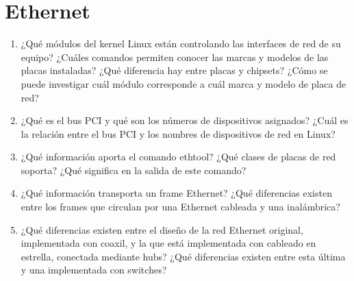 


\section{Ethernet}
\begin{enumerate}
\item ¿Qué módulos del kernel Linux están controlando las interfaces de red de su equipo? ¿Cuáles comandos permiten conocer las marcas y modelos de las placas instaladas? ¿Qué diferencia hay entre placas y chipsets? ¿Cómo se puede investigar cuál módulo corresponde a cuál marca y modelo de placa de red? 
\item ¿Qué es el bus PCI y qué son los números de dispositivos asignados? ¿Cuál es la relación entre el bus PCI y los nombres de dispositivos de red en Linux?
\item ¿Qué información aporta el comando ethtool? ¿Qué clases de placas de red soporta? ¿Qué significa  en la salida de este comando?
\item ¿Qué información transporta un frame Ethernet? ¿Qué diferencias existen entre los frames que circulan por una Ethernet cableada y una inalámbrica? 
\item ¿Qué diferencias existen entre el diseño de la red Ethernet original, implementada con coaxil, y la que está implementada con cableado en estrella, conectada mediante hubs? ¿Qué diferencias existen entre esta última y una implementada con switches?
\end{enumerate}

